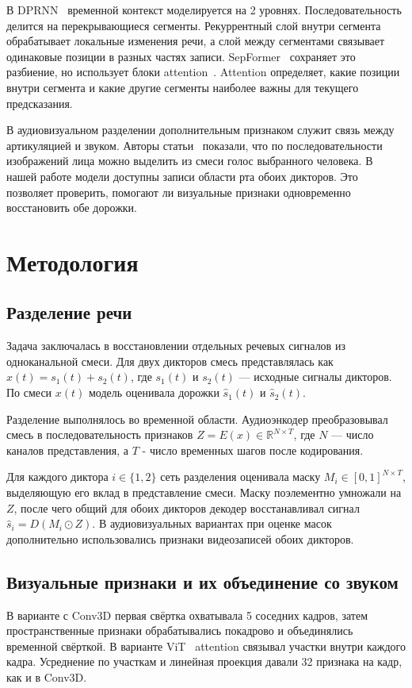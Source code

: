 \documentclass[10pt,conference,compsocconf]{IEEEtran}
\begin{document}
В DPRNN~\cite{luo2020dprnn} временной контекст моделируется на 2 уровнях. Последовательность делится на перекрывающиеся сегменты. Рекуррентный слой внутри сегмента обрабатывает локальные изменения речи, а слой между сегментами связывает одинаковые позиции в разных частях записи. SepFormer~\cite{subakan2021sepformer} сохраняет это разбиение, но использует блоки attention~\cite{vaswani2017attention}. Attention определяет, какие позиции внутри сегмента и какие другие сегменты наиболее важны для текущего предсказания.

В аудиовизуальном разделении дополнительным признаком служит связь между артикуляцией и звуком. Авторы статьи~\cite{ephrat2018looking} показали, что по последовательности изображений лица можно выделить из смеси голос выбранного человека. В нашей работе модели доступны записи области рта обоих дикторов. Это позволяет проверить, помогают ли визуальные признаки одновременно восстановить обе дорожки.

\section{Методология}\label{sec:methodology}

\subsection{Разделение речи}
Задача заключалась в восстановлении отдельных речевых сигналов из одноканальной смеси. Для двух дикторов смесь представлялась как $x(t)=s_1(t)+s_2(t)$, где $s_1(t)$ и $s_2(t)$ --- исходные сигналы дикторов. По смеси $x(t)$ модель оценивала дорожки $\hat{s}_1(t)$ и $\hat{s}_2(t)$.

Разделение выполнялось во временной области. Аудиоэнкодер преобразовывал смесь в последовательность признаков $Z=E(x)\in\mathbb{R}^{N\times T}$, где $N$ --- число каналов представления, а $T$ - число временных шагов после кодирования.

Для каждого диктора $i\in\{1,2\}$ сеть разделения оценивала маску $M_i\in[0,1]^{N\times T}$, выделяющую его вклад в представление смеси. Маску поэлементно умножали на $Z$, после чего общий для обоих дикторов декодер восстанавливал сигнал $\hat{s}_i=D(M_i\odot Z)$. В аудиовизуальных вариантах при оценке масок дополнительно использовались признаки видеозаписей обоих дикторов.

\subsection{Визуальные признаки и их объединение со звуком}
В варианте с Conv3D первая свёртка охватывала 5 соседних кадров, затем пространственные признаки обрабатывались покадрово и объединялись временной свёрткой. В варианте ViT~\cite{dosovitskiy2021vit} attention связывал участки внутри каждого кадра. Усреднение по участкам и линейная проекция давали 32 признака на кадр, как и в Conv3D.
\end{document}
